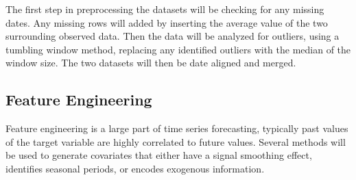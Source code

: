 \documentclass[sigconf]{acmart}
\begin{document}
  The first step in preprocessing the datasets will be checking for any missing dates. Any missing rows will added by inserting the average value of the two surrounding observed data. Then the data will be analyzed for outliers, using a tumbling window method, replacing any identified outliers with the median of the window size. The two datasets will then be date aligned and merged.
  
    \subsection{Feature Engineering}
  Feature engineering is a large part of time series forecasting, typically past values of the target variable are highly correlated to future values. Several methods will be used to generate covariates that either have a signal smoothing effect, identifies seasonal periods, or encodes exogenous information.
\end{document}
